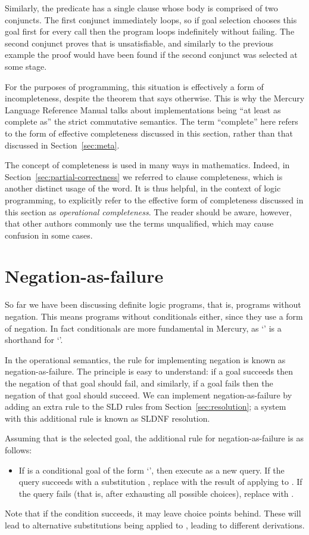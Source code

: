 Similarly,
the predicate  has a single clause
whose body is comprised of two conjuncts.
The first conjunct immediately loops,
so if goal selection chooses this goal first for every call
then the program loops indefinitely without failing.
The second conjunct proves that  is unsatisfiable,
and similarly to the previous example the proof would have been found
if the second conjunct was selected at some stage.

For the purposes of programming,
this situation is effectively a form of incompleteness,
despite the theorem that says otherwise.
This is why the Mercury Language Reference Manual
talks about implementations being
``at least as complete as'' the strict commutative semantics.
The term ``complete'' here refers to
the form of effective completeness discussed in this section,
rather than that discussed in Section~\ref{sec:meta}.

The concept of completeness is used in many ways in mathematics.
Indeed,
in Section~\ref{sec:partial-correctness}
we referred to clause completeness,
which is another distinct usage of the word.
It is thus helpful, in the context of logic programming,
to explicitly refer to the effective form of completeness
discussed in this section as \emph{operational completeness}.
The reader should be aware, however,
that other authors commonly use the terms unqualified,
which may cause confusion in some cases.


\section{Negation-as-failure}
\label{sec:naf}

So far we have been discussing definite logic programs,
that is, programs without negation.
This means programs without conditionals either,
since they use a form of negation.
In fact conditionals are more fundamental in Mercury,
as `' is a shorthand for
`'.

In the operational semantics,
the rule for implementing negation is known as negation-as-failure.
The principle is easy to understand:
if a goal succeeds then
the negation of that goal should fail,
and similarly, if a goal fails then
the negation of that goal should succeed.
We can implement negation-as-failure
by adding an extra rule to the SLD rules
from Section~\ref{sec:resolution};
a system with this additional rule
is known as SLDNF resolution.

Assuming that  is the selected goal,
the additional rule for negation-as-failure
is as follows:
\begin{itemize}
\item
If  is a conditional goal of the form
`',
then execute  as a new query.
If the query succeeds with a substitution ,
replace  with
the result of applying  to .
If the query fails
(that is, after exhausting all possible choices),
replace  with .
\end{itemize}
Note that if the condition succeeds,
it may leave choice points behind.
These will lead to alternative substitutions
being applied to ,
leading to different derivations.

